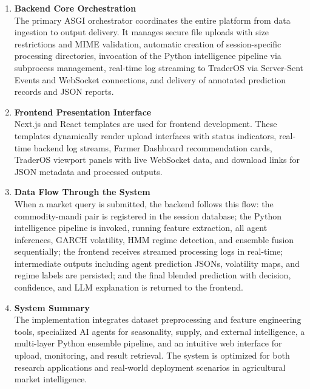 \documentclass[12pt,a4paper]{report}
\theoremstyle{definition}
\theoremstyle{remark}
\begin{document}
\begin{enumerate}

    \item \textbf{Backend Core Orchestration}\\
    The primary ASGI orchestrator coordinates the entire platform from data ingestion to output delivery. It manages secure file uploads with size restrictions and MIME validation, automatic creation of session-specific processing directories, invocation of the Python intelligence pipeline via subprocess management, real-time log streaming to TraderOS via Server-Sent Events and WebSocket connections, and delivery of annotated prediction records and JSON reports.

    \item \textbf{Frontend Presentation Interface}\\
    Next.js and React templates are used for frontend development. These templates dynamically render upload interfaces with status indicators, real-time backend log streams, Farmer Dashboard recommendation cards, TraderOS viewport panels with live WebSocket data, and download links for JSON metadata and processed outputs.

    \item \textbf{Data Flow Through the System}\\
    When a market query is submitted, the backend follows this flow: the commodity-mandi pair is registered in the session database; the Python intelligence pipeline is invoked, running feature extraction, all agent inferences, GARCH volatility, HMM regime detection, and ensemble fusion sequentially; the frontend receives streamed processing logs in real-time; intermediate outputs including agent prediction JSONs, volatility maps, and regime labels are persisted; and the final blended prediction with decision, confidence, and LLM explanation is returned to the frontend.

    \item \textbf{System Summary}\\
    The implementation integrates dataset preprocessing and feature engineering tools, specialized AI agents for seasonality, supply, and external intelligence, a multi-layer Python ensemble pipeline, and an intuitive web interface for upload, monitoring, and result retrieval. The system is optimized for both research applications and real-world deployment scenarios in agricultural market intelligence.

\end{enumerate}
\end{document}
